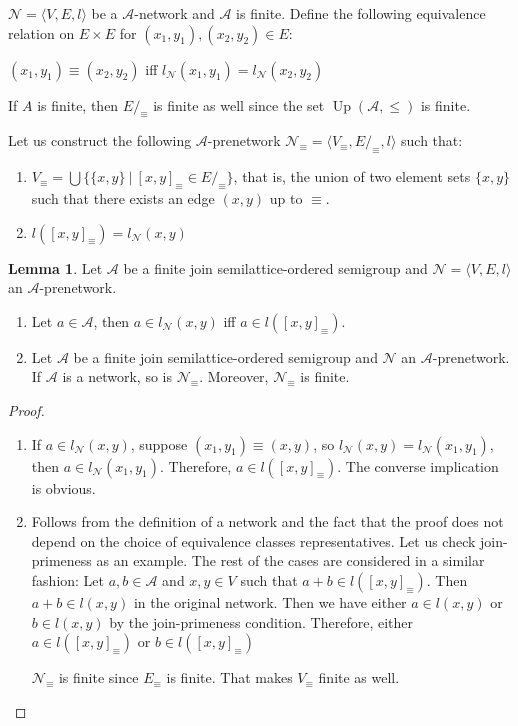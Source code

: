\documentclass[a4paper]{article}
\theoremstyle{definition}
\theoremstyle{theorem}
\theoremstyle{proposition}
\theoremstyle{lemma}
\newtheorem{lemma}{Lemma}
\theoremstyle{ex}
\theoremstyle{corollary}
\theoremstyle{claim}
\begin{document}
$\mathcal{N} = \langle V, E, l \rangle$ be a $\mathcal{A}$-network and $\mathcal{A}$ is finite. Define the following equivalence relation on $E \times E$ for $(x_1, y_1), (x_2, y_2) \in E$:
\begin{center}
  $(x_1, y_1) \equiv (x_2, y_2)$ iff $l_{\mathcal{N}}(x_1, y_1) = l_{\mathcal{N}}(x_2, y_2)$
\end{center}
If $A$ is finite, then $E /_{\equiv}$ is finite as well since the set $\operatorname{Up}(\mathcal{A}, \leq)$ is finite.

Let us construct the following $\mathcal{A}$-prenetwork $\mathcal{N}_{\equiv} = \langle V_{\equiv}, E /_{\equiv}, l \rangle$ such that:
\begin{enumerate}
  \item $V_{\equiv} = \bigcup \{ \{ x, y \} \: | \: [x,y]_{\equiv} \in E /_{\equiv} \}$, that is, the union of two element sets $\{ x, y \}$ such that there exists an edge $(x,y)$ up to $\equiv$.
  \item $l([x,y]_{\equiv}) = l_{\mathcal{N}}(x,y)$
\end{enumerate}

\begin{lemma} Let $\mathcal{A}$ be a finite join semilattice-ordered semigroup and $\mathcal{N} = \langle V, E, l \rangle$ an $\mathcal{A}$-prenetwork.
  \begin{enumerate}
  \item Let $a \in \mathcal{A}$, then $a \in l_{\mathcal{N}}(x,y)$ iff $a \in l([x,y]_{\equiv})$.

  \item Let $\mathcal{A}$ be a finite join semilattice-ordered semigroup and $\mathcal{N}$ an $\mathcal{A}$-prenetwork. If $\mathcal{A}$ is a network, so is $\mathcal{N}_{\equiv}$. Moreover, $\mathcal{N}_{\equiv}$ is finite.
\end{enumerate}
\end{lemma}

\begin{proof}
$ $
  \begin{enumerate}
  \item If $a \in l_{\mathcal{N}}(x,y)$, suppose $(x_1,y_1) \equiv (x,y)$, so $l_{\mathcal{N}}(x,y) = l_{\mathcal{N}}(x_1,y_1)$, then $a \in l_{\mathcal{N}}(x_1,y_1)$. Therefore, $a \in l([x,y]_{\equiv})$. The converse implication is obvious.
  \item Follows from the definition of a network and the fact that the proof does not depend on the choice of equivalence classes representatives.
  Let us check join-primeness as an example. The rest of the cases are considered in a similar fashion:
  Let $a, b \in \mathcal{A}$ and $x, y \in V$ such that $a + b \in l([x,y]_{\equiv})$.
  Then $a + b \in l(x,y)$ in the original network. Then we have either $a \in l(x,y)$ or $b \in l(x,y)$ by the join-primeness condition. Therefore, either $a \in l([x,y]_{\equiv})$ or $b \in l([x,y]_{\equiv})$

  $\mathcal{N}_{\equiv}$ is finite since $E_{\equiv}$ is finite. That makes $V_{\equiv}$ finite as well.
  \end{enumerate}
\end{proof}
\end{document}

